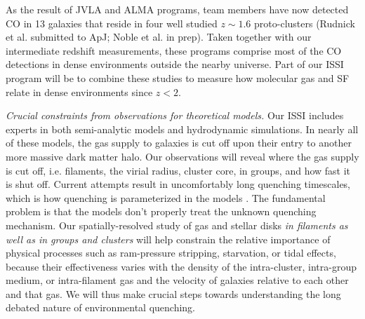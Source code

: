 \documentclass[11pt]{article}
\begin{document}
As the result of JVLA and ALMA programs, team members have now detected CO
in 13 galaxies that reside in four well studied $z\sim 1.6$ proto-clusters
(Rudnick et al. submitted to ApJ; Noble et al. in prep).  Taken together with our intermediate
redshift measurements, these programs comprise most of the CO
detections in dense environments outside the nearby universe.  Part of
our ISSI program will be to combine these studies to measure how
molecular gas and SF relate in dense environments since
$z<2$.  

\textit{Crucial constraints from observations for theoretical models.} Our
ISSI includes experts in both semi-analytic models and hydrodynamic simulations.  In nearly all of these
models, the gas supply to galaxies is cut off upon their entry to
another more massive dark matter halo.
Our observations will reveal where the gas supply is cut off, i.e. filaments, the virial radius, cluster core, in groups, and how fast it is shut off.  Current
attempts result in uncomfortably
long quenching timescales, which is how quenching is parameterized in the models \citep{McGee11,DeLucia12a}. The fundamental
problem is that the models don't properly treat the unknown quenching mechanism.
Our spatially-resolved study of gas and stellar disks {\em in filaments as well as in groups and clusters} will help constrain the relative importance of physical processes such as ram-pressure stripping, starvation, or tidal effects, because their effectiveness varies with
the density of the intra-cluster, intra-group medium, or intra-filament gas and the velocity of galaxies relative to each other and that gas. 
We will thus make crucial steps towards understanding the long debated nature of environmental quenching.
\end{document}
